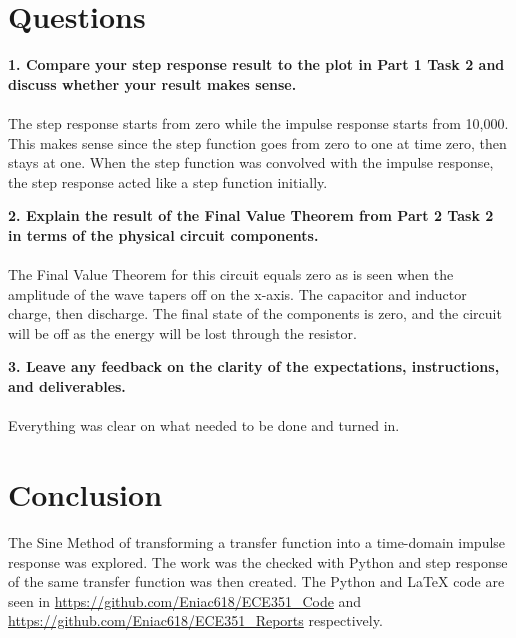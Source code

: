 \documentclass[12pt]{report}
\begin{document}
\section{Questions}
\textbf{1. Compare your step response result to the plot in Part 1 Task 2 and discuss whether your result makes
sense.} \\ \\
The step response starts from zero while the impulse response starts from 10,000. This makes sense since the step function goes from zero to one at time zero, then stays at one. When the step function was convolved with the impulse response, the step response acted like a step function initially. 

\textbf{2. Explain the result of the Final Value Theorem from Part 2 Task 2 in terms of the physical
circuit components.} \\ \\
The Final Value Theorem for this circuit equals zero as is seen when the amplitude of the wave tapers off on the x-axis. The capacitor and inductor charge, then discharge. The final state of the components is zero, and the circuit will be off as the energy will be lost through the resistor.

\textbf{3. Leave any feedback on the clarity of the expectations, instructions, and deliverables.} \\ \\
Everything was clear on what needed to be done and turned in.

\section{Conclusion}
The Sine Method of transforming a transfer function into a time-domain impulse response was explored. The work was the checked with Python and step response of the same transfer function was then created. The Python and \LaTeX{} code are seen in \url{https://github.com/Eniac618/ECE351_Code} and \url{https://github.com/Eniac618/ECE351_Reports} respectively.
\end{document}
